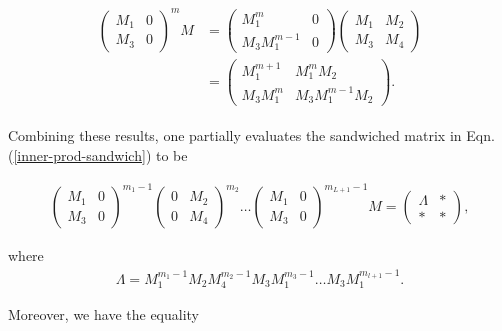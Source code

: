 \begin{align}
\begin{split}
  \begin{pmatrix} M_1 & 0 \\ M_3 & 0 \end{pmatrix}^{m}M &=   \begin{pmatrix} M_1^m & 0 \\ M_3M_1^{m-1} & 0 \end{pmatrix}\begin{pmatrix}M_1 & M_2 \\ M_3 & M_4\end{pmatrix}\\
  &= \begin{pmatrix}M_1^{m+1} & M_1^{m}M_2 \\ M_3M_1^{m} & M_3M_1^{m-1}M_2 \end{pmatrix}.
\end{split}
\end{align}

Combining these results, one partially evaluates the sandwiched matrix in Eqn. (\ref{inner-prod-sandwich}) to be 

\begin{align}
\begin{pmatrix}M_1 & 0 \\ M_3 & 0 \end{pmatrix}^{m_1-1}\begin{pmatrix} 0 & M_2 \\ 0 & M_4 \end{pmatrix}^{m_2}\ldots\begin{pmatrix} M_1 & 0 \\ M_3 & 0 \end{pmatrix}^{m_{L+1}-1}M = \begin{pmatrix}\Lambda & \ast \\
\ast & \ast \end{pmatrix},
\end{align}

where 
\begin{align}
    \Lambda = M_1^{m_1-1}M_2M_4^{m_2-1}M_3M_1^{m_3-1}\ldots M_3M_1^{m_{l+1}-1}.
\end{align}

Moreover, we have the equality 

